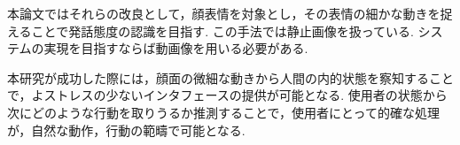 本論文ではそれらの改良として，顔表情を対象とし，その表情の細かな動きを捉えることで発話態度の認識を目指す.
この手法では静止画像を扱っている.
システムの実現を目指すならば動画像を用いる必要がある.

本研究が成功した際には，顔面の微細な動きから人間の内的状態を察知することで，よストレスの少ないインタフェースの提供が可能となる.
使用者の状態から次にどのような行動を取りうるか推測することで，使用者にとって的確な処理が，自然な動作，行動の範疇で可能となる.
